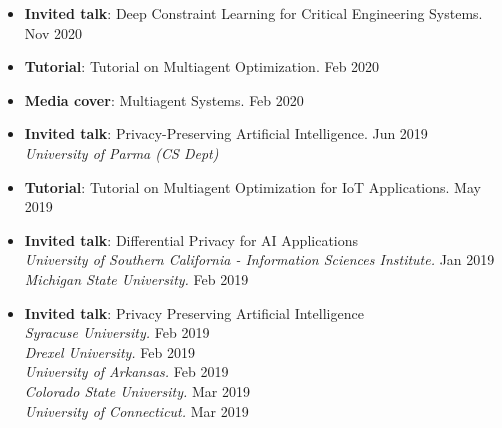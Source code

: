 \begin{itemize}

  \item {\bf Invited talk}: Deep Constraint Learning for Critical Engineering Systems. \hfill {Nov 2020}\\
  
  \item {\bf Tutorial}: {Tutorial on Multiagent Optimization.} \hfill {Feb 2020}\\ 
  
  \item {\bf Media cover}: {Multiagent Systems.} \hfill{Feb 2020}\\

  \item {\bf Invited talk}:  Privacy-Preserving Artificial Intelligence. \hfill {Jun 2019}\\
  {\em University of Parma (CS Dept)} 

  \item {\bf Tutorial}: {Tutorial on Multiagent Optimization for IoT Applications.} \hfill {May 2019}\\ 

  \item {\bf Invited talk}: Differential Privacy for AI Applications\\
  {\em University of Southern California - Information Sciences Institute.} \hfill {Jan 2019}\\
  {\em Michigan State University.} \hfill {Feb 2019}

  \item {\bf Invited talk}: Privacy Preserving Artificial Intelligence\\
  {\em Syracuse University.} \hfill {Feb 2019}\\
  {\em Drexel University.} \hfill {Feb 2019}\\
  {\em University of Arkansas.} \hfill {Feb 2019}\\
  {\em Colorado State University.} \hfill {Mar 2019}\\
  {\em University of Connecticut.} \hfill {Mar 2019}


\end{itemize}
